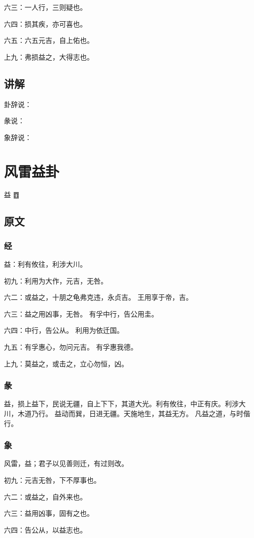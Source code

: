 \documentclass[12pt,oneside]{book}
\begin{document}
六三：一人行，三则疑也。

六四：损其疾，亦可喜也。

六五：六五元吉，自上佑也。

上九：弗损益之，大得志也。

\section{讲解}
卦辞说：

彖说：

象辞说：

\chapter{风雷益卦}
益 {\Large ䷩}
\section{原文}

\subsection{经}
益：利有攸往，利涉大川。

初九：利用为大作，元吉，无咎。

六二：或益之，十朋之龟弗克违，永贞吉。 王用享于帝，吉。

六三：益之用凶事，无咎。 有孚中行，告公用圭。

六四：中行，告公从。 利用为依迁国。

九五：有孚惠心，勿问元吉。 有孚惠我德。

上九：莫益之，或击之，立心勿恒，凶。

\subsection{彖}
益，损上益下，民说无疆，自上下下，其道大光。利有攸往，中正有庆。利涉大川，木道乃行。 益动而巽，日进无疆。天施地生，其益无方。 凡益之道，与时偕行。

\subsection{象}
风雷，益；君子以见善则迁，有过则改。

初九：元吉无咎，下不厚事也。

六二：或益之，自外来也。

六三：益用凶事，固有之也。

六四：告公从，以益志也。
\end{document}

